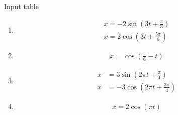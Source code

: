 \documentclass[journal,12pt,twocolumn]{IEEEtran}
\theoremstyle{remark}
\begin{document}
\begin{table}[htbp]
    \centering
    
    \caption{Input table}
    \label{tab:parameter_table.11.9.3.28}
\end{table}
\begin{enumerate}[label=\roman*)]
\item \begin{align}
    x = -2 \sin\left(3t + \frac{\pi}{3}\right)\\
   x =2\cos\left(3t+\frac{5\pi}{6}\right)
\end{align}
\begin{figure}[!htbp]
    
\end{figure}
\item \begin{align}
    x = \cos\left(\frac{\pi}{6} - t\right)
\end{align}
\begin{figure}[!htbp]
    
\end{figure}

\item \begin{align}
    x &= 3 \sin\left(2\pi t + \frac{\pi}{4}\right)\\
    x &= -3\cos\left(2\pi t + \frac{3\pi}{4}\right)
\end{align}
\begin{figure}[!htbp]
    
\end{figure}

\item 
\begin{align}
    x = 2 \cos(\pi t)
\end{align}
\begin{figure}[!htbp]
    
\end{figure}


\end{enumerate}

\end{document}

